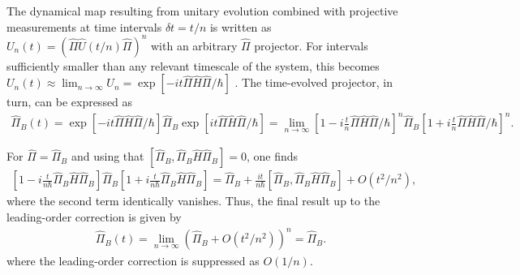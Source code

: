 \documentclass[prl,aps,amssymb,twocolumn,superscriptaddress, notitlepage, longbibliography]{revtex4-2}
\begin{document}
The dynamical map resulting from unitary evolution combined with projective measurements at time intervals $\delta t=t/n$ is written as $U_n(t)=\left(\hat\Pi\hat U(t/n)\hat\Pi\right)^n$ with an arbitrary $\hat\Pi$ projector. For intervals sufficiently smaller than any relevant timescale of the system, this becomes $U_n(t)\approx\lim_{n\rightarrow\infty} U_n=\exp\left[-it\hat\Pi\hat H\hat\Pi/\hbar\right]$ \cite{Facchi08}. The time-evolved projector, in turn, can be expressed as
\begin{eqnarray}
\hat\Pi_B(t)=\exp\left[-it\hat\Pi\hat H\hat\Pi/\hbar\right]\hat\Pi_B\exp\left[it\hat\Pi\hat H\hat\Pi/\hbar\right]= \lim_{n\rightarrow\infty}  \left[1-i\frac{t}{n}\hat\Pi\hat H\hat\Pi/\hbar\right]^n\hat\Pi_B\left[1+i\frac{t}{n}\hat\Pi\hat H\hat\Pi/\hbar\right]^n.
\end{eqnarray}

For $\hat\Pi=\hat\Pi_B$ and using that $\left[\hat\Pi_B,\hat\Pi_B\hat H\hat\Pi_B\right]=0$, one finds
\begin{eqnarray}
    \left[1-i\frac{t}{n\hbar}\hat\Pi_B\hat H\hat\Pi_B\right]\hat\Pi_B\left[1+i\frac{t}{n\hbar}\hat\Pi_B\hat H\hat\Pi_B\right]=\hat\Pi_B+\frac{it}{n\hbar}\left[\hat\Pi_B,\hat\Pi_B\hat H\hat\Pi_B\right]+O(t^2/n^2),
\end{eqnarray}
where the second term identically vanishes.
Thus, the final result up to the leading-order correction is given by
\begin{eqnarray}
    \hat \Pi_B(t)=\lim_{n\rightarrow\infty}\left(\hat\Pi_B+O(t^2/n^2)\right)^n=\hat\Pi_B.
\end{eqnarray}
where the leading-order correction is suppressed as $O(1/n)$.
\end{document}
